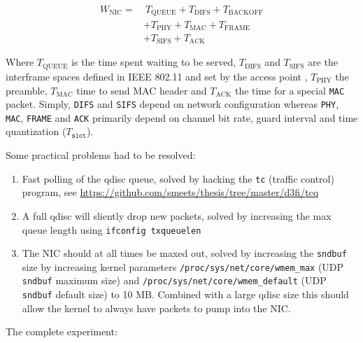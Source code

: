 \begin{align}
\label{eq:wnic}
W_\text{NIC} =&~T_\text{QUEUE} + T_\text{DIFS} + T_\text{BACKOFF} \nonumber\\
              &+ T_\text{PHY} + T_\text{MAC} + T_\text{FRAME}\\
              &+ T_\text{SIFS} + T_\text{ACK}\nonumber
\end{align}

Where $T_\text{QUEUE}$ is the time spent waiting to be served, $T_\text{DIFS}$
and $T_\text{SIFS}$ are the interframe spaces defined in IEEE 802.11 and set
by the access point \cite{654749}, $T_\text{PHY}$ the preamble, $T_\text{MAC}$
time to send MAC header and $T_\text{ACK}$ the time for a special \texttt{MAC}
packet. Simply, \texttt{DIFS} and \texttt{SIFS} depend on network
configuration whereas \texttt{PHY}, \texttt{MAC}, \texttt{FRAME} and
\texttt{ACK} primarily depend on channel bit rate, guard interval and time
quantization ($T_\texttt{slot}$).

Some practical problems had to be resolved:

\begin{enumerate}

  \item Fast polling of the qdisc queue, solved by hacking the \texttt{tc}
(traffic control) program, see
\url{https://github.com/smeets/thesis/tree/master/d3fi/tcq}

  \item A full qdisc will sliently drop new packets, solved by increasing the
  max queue length using \texttt{ifconfig txqueuelen}

  \item The NIC should at all times be maxed out, solved by increasing the
\texttt{sndbuf} size by increasing kernel parameters
\texttt{/proc/sys/net/core/wmem\_max} (UDP \texttt{sndbuf} maximum size) and
\texttt{/proc/sys/net/core/wmem\_default} (UDP \texttt{sndbuf} default size)
to 10 MB. Combined with a large qdisc size this should allow the kernel to
always have packets to pump into the NIC.

\end{enumerate}

The complete experiment:


